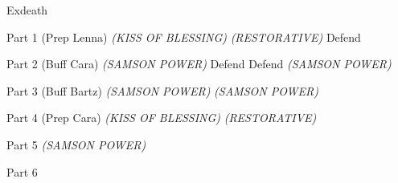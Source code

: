 \begin{paracol}{2}
\switchcolumn
\begin{boss}{Exdeath}
    \varwb
    \begin{bossPart}{Part 1 (Prep Lenna)}
        \bartz[\bossHl{(1x)}] \rightCommand{\combine} \then \battleGroup{\revivify \space + \space \maidensKiss} \textit{(KISS OF BLESSING)} \then {}
        \faris[\bossHl{(1x)}] \rightCommand{\combine} \then \battleGroup{\eyedrop \space + \space \antidote{}} \textit{(RESTORATIVE)} \then {}
        \cara[\bossHl{(1x)}] Defend
        \lenna[\bossHl{(1x)}] \leftCommand{\magicSword} \then \breakSpell
    \end{bossPart}
    \begin{bossPart}{Part 2 (Buff Cara)}
        \bartzFaris[\bossHl{(4x)}] \rightCommand{\combine} \then \battleGroup{\revivify \space + \space \antidote} \textit{(SAMSON POWER)} \then {}
         Defend
        \cara[\bossHl{(1x)}] Defend
        \bartzFaris[\bossHl{(4x)}] \rightCommand{\combine} \then \battleGroup{\revivify \space + \space \antidote} \textit{(SAMSON POWER)} \then {}
        \cara[\bossHl{(1x)}] \leftCommand{\kick}
    \end{bossPart}
    \begin{bossPart}{Part 3 (Buff Bartz)}
        \bartzFaris[\bossHl{(4x)}] \rightCommand{\combine} \then \battleGroup{\revivify \space + \space \antidote} \textit{(SAMSON POWER)} \then {}
        \cara[\bossHl{(1x)}] \rightCommand{\gilToss}
        \bartzFaris[\bossHl{(2x)}] \rightCommand{\combine} \then \battleGroup{\revivify \space + \space \antidote} \textit{(SAMSON POWER)} \then {}
    \end{bossPart}
    \begin{bossPart}{Part 4 (Prep Cara)}
        \bartz[\bossHl{(1x)}] \rightCommand{\combine} \then \battleGroup{\revivify \space + \space \maidensKiss} \textit{(KISS OF BLESSING)} \then {}
        \faris[\bossHl{(1x)}] \rightCommand{\combine} \then \battleGroup{\eyedrop \space + \space \antidote{}} \textit{(RESTORATIVE)} \then {}
        \item {}
    \end{bossPart}
    \begin{bossPart}{Part 5}
        \bartz[\bossHl{(1x)}] \leftCommand{\gilToss}
        \cara[\bossHl{(1x)}] \rightCommand{\gilToss}
        \faris[\bossHl{(1x)}] \rightCommand{\combine} \then \battleGroup{\revivify \space + \space \antidote} \textit{(SAMSON POWER)} \then {}
    \end{bossPart}
    \begin{bossPart}{Part 6}
        \bartz[\bossHl{(1x)}] \leftCommand{\gilToss}
        \item {}
        \cara[\bossHl{(1x)}] \rightCommand{\gilToss}
    \end{bossPart}
    \varwe
\end{boss}


\end{paracol}
